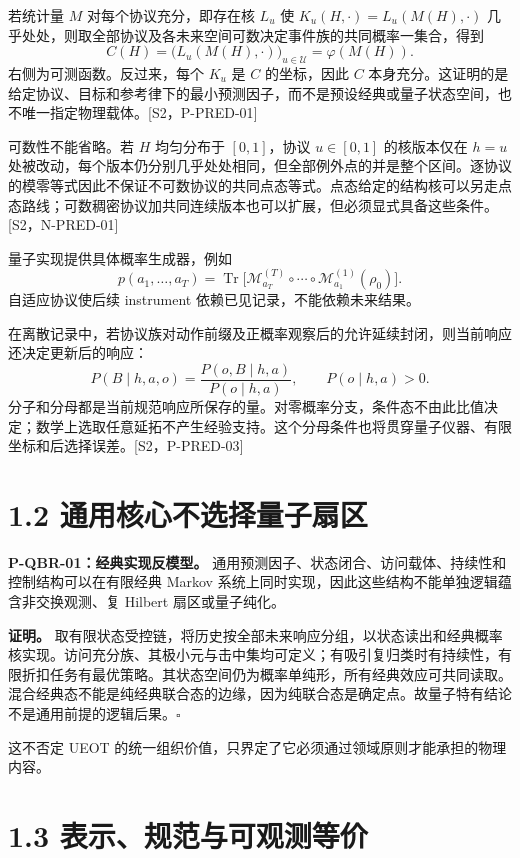 \documentclass[
  11pt,
  oneside]{book}
\begin{document}
若统计量 \(M\) 对每个协议充分，即存在核 \(L_u\) 使
\(K_u(H,\cdot)=L_u(M(H),\cdot)\)
几乎处处，则取全部协议及各未来空间可数决定事件族的共同概率一集合，得到
\[
C(H)=\bigl(L_u(M(H),\cdot)\bigr)_{u\in\mathcal U}=\varphi(M(H)).
\] 右侧为可测函数。反过来，每个 \(K_u\) 是 \(C\) 的坐标，因此 \(C\)
本身充分。这证明的是给定协议、目标和参考律下的最小预测因子，而不是预设经典或量子状态空间，也不唯一指定物理载体。{[}S2，P-PRED-01{]}

可数性不能省略。若 \(H\) 均匀分布于 \([0,1]\)，协议 \(u\in[0,1]\)
的核版本仅在 \(h=u\)
处被改动，每个版本仍分别几乎处处相同，但全部例外点的并是整个区间。逐协议的模零等式因此不保证不可数协议的共同点态等式。点态给定的结构核可以另走点态路线；可数稠密协议加共同连续版本也可以扩展，但必须显式具备这些条件。{[}S2，N-PRED-01{]}

量子实现提供具体概率生成器，例如 \[
p(a_1,\ldots,a_T)=
\operatorname{Tr}\bigl[
\mathcal M_{a_T}^{(T)}\circ\cdots\circ
\mathcal M_{a_1}^{(1)}(\rho_0)\bigr].
\] 自适应协议使后续 instrument 依赖已见记录，不能依赖未来结果。

在离散记录中，若协议族对动作前缀及正概率观察后的允许延续封闭，则当前响应还决定更新后的响应：
\[
P(B\mid h,a,o)=\frac{P(o,B\mid h,a)}{P(o\mid h,a)},\qquad P(o\mid h,a)>0.
\]
分子和分母都是当前规范响应所保存的量。对零概率分支，条件态不由此比值决定；数学上选取任意延拓不产生经验支持。这个分母条件也将贯穿量子仪器、有限坐标和后选择误差。{[}S2，P-PRED-03{]}

\section{1.2 通用核心不选择量子扇区}

\protect\hypertarget{p-qbr-01}{}{}

\textbf{P-QBR-01：经典实现反模型。}
通用预测因子、状态闭合、访问载体、持续性和控制结构可以在有限经典 Markov
系统上同时实现，因此这些结构不能单独逻辑蕴含非交换观测、复 Hilbert
扇区或量子纯化。

\textbf{证明。}
取有限状态受控链，将历史按全部未来响应分组，以状态读出和经典概率核实现。访问充分族、其极小元与击中集均可定义；有吸引复归类时有持续性，有限折扣任务有最优策略。其状态空间仍为概率单纯形，所有经典效应可共同读取。混合经典态不能是纯经典联合态的边缘，因为纯联合态是确定点。故量子特有结论不是通用前提的逻辑后果。\(\square\)

这不否定 UEOT
的统一组织价值，只界定了它必须通过领域原则才能承担的物理内容。

\section{1.3 表示、规范与可观测等价}
\end{document}

